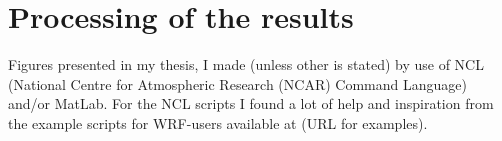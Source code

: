 \section{Processing of the results}
Figures presented in my thesis, I made (unless other is stated) by use of NCL (National Centre for Atmospheric Research (NCAR) Command Language) and/or MatLab. For the NCL scripts I found a lot of help and inspiration from the example scripts for WRF-users available at (URL for examples).



